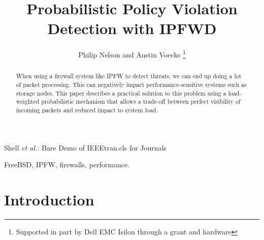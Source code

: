\documentclass[journal]{IEEEtran}
\begin{document}
%
\title{Probabilistic Policy Violation Detection with IPFWD}

\author{Philip Nelson and Austin Voecks%
\thanks{Supported in part by Dell EMC Isilon through a grant and hardware}}


%
{Shell \MakeLowercase{\textit{et al.}}: Bare Demo of IEEEtran.cls for Journals}
% 


\maketitle


\begin{abstract}
When using a firewall system like IPFW to detect threats, we can end up doing a
lot of packet processing. This can negatively impact performance-sensitive
systems such as storage nodes. This paper describes a practical solution to
this problem using a load-weighted probabilistic mechanism that allows a
trade-off between perfect visibility of incoming packets and reduced impact to
system load.  

\end{abstract}


\begin{IEEEkeywords}
FreeBSD, IPFW, firewalls, performance.
\end{IEEEkeywords}


%
\IEEEpeerreviewmaketitle


\section{Introduction}
\end{document}
